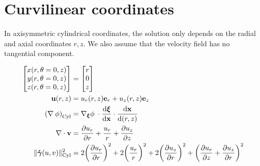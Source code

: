 \documentclass[11 pt]{report}
\begin{document}





\appendix
\chapter{Curvilinear coordinates}
\label{appendix:curvilinear}

In axisymmetric cylindrical coordinates, the solution only depends on the radial and axial coordinates $r, z$. We also assume that the velocity field has no tangential component.

\begin{align}
    \begin{bmatrix}
        x(r, \theta=0, z) \\
        y(r, \theta=0, z) \\
        z(r, \theta=0, z) \\
    \end{bmatrix} &=
    \begin{bmatrix}
        r \\
        0 \\
        z
    \end{bmatrix}\\
    \mathbf{u}(r, z) &= u_r(r, z) \mathbf{e}_r + u_z(r, z) \mathbf{e}_z\\
    \left(\nabla \: \phi\right)_{\text{Cyl}} &= \nabla_{\boldsymbol\xi} \phi \; \cdot \dv{\boldsymbol \xi}{\mathbf{x}} \cdot \dv{\mathbf{x}}{(r, z)}\\
    \nabla \cdot \mathbf{v} &= \pdv{u_r}{r} + \frac{u_r}{r} + \pdv{u_z}{z}\\
    \|\boldsymbol{\dot \gamma}(u, v)\|_{\text{Cyl}}^2 &= 2 \bigg(\pdv{u_r}{r}\bigg)^2 + 2\bigg(\frac{u_r}{r}\bigg)^2 + 2\bigg(\pdv{u_z}{r}\bigg)^2 + \bigg(\pdv{u_r}{z} + \pdv{u_z}{r}\bigg)^2
\end{align}
\end{document}
